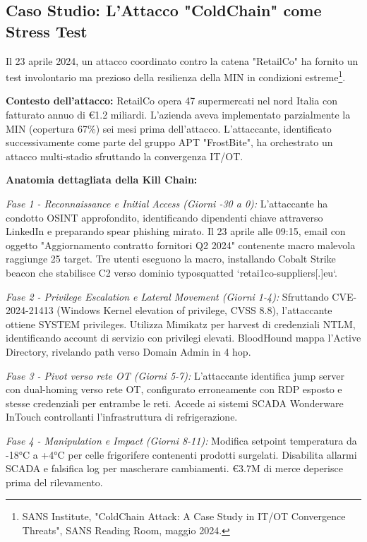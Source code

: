 \subsection{Caso Studio: L'Attacco "ColdChain" come Stress Test}

Il 23 aprile 2024, un attacco coordinato contro la catena "RetailCo" ha fornito un test involontario ma prezioso della resilienza della MIN in condizioni estreme\footnote{SANS Institute, "ColdChain Attack: A Case Study in IT/OT Convergence Threats", SANS Reading Room, maggio 2024.}.

\textbf{Contesto dell'attacco:}
RetailCo opera 47 supermercati nel nord Italia con fatturato annuo di €1.2 miliardi. L'azienda aveva implementato parzialmente la MIN (copertura 67\%) sei mesi prima dell'attacco. L'attaccante, identificato successivamente come parte del gruppo APT "FrostBite", ha orchestrato un attacco multi-stadio sfruttando la convergenza IT/OT.

\textbf{Anatomia dettagliata della Kill Chain:}

\textit{Fase 1 - Reconnaissance e Initial Access (Giorni -30 a 0):}
L'attaccante ha condotto OSINT approfondito, identificando dipendenti chiave attraverso LinkedIn e preparando spear phishing mirato. Il 23 aprile alle 09:15, email con oggetto "Aggiornamento contratto fornitori Q2 2024" contenente macro malevola raggiunge 25 target. Tre utenti eseguono la macro, installando Cobalt Strike beacon che stabilisce C2 verso dominio typosquatted `retai1co-suppliers[.]eu`.

\textit{Fase 2 - Privilege Escalation e Lateral Movement (Giorni 1-4):}
Sfruttando CVE-2024-21413 (Windows Kernel elevation of privilege, CVSS 8.8), l'attaccante ottiene SYSTEM privileges. Utilizza Mimikatz per harvest di credenziali NTLM, identificando account di servizio con privilegi elevati. BloodHound mappa l'Active Directory, rivelando path verso Domain Admin in 4 hop.

\textit{Fase 3 - Pivot verso rete OT (Giorni 5-7):}
L'attaccante identifica jump server con dual-homing verso rete OT, configurato erroneamente con RDP esposto e stesse credenziali per entrambe le reti. Accede ai sistemi SCADA Wonderware InTouch controllanti l'infrastruttura di refrigerazione.

\textit{Fase 4 - Manipulation e Impact (Giorni 8-11):}
Modifica setpoint temperatura da -18°C a +4°C per celle frigorifere contenenti prodotti surgelati. Disabilita allarmi SCADA e falsifica log per mascherare cambiamenti. €3.7M di merce deperisce prima del rilevamento.

